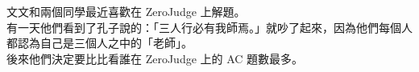 文文和兩個同學最近喜歡在 ZeroJudge 上解題。\\
有一天他們看到了孔子說的：「三人行必有我師焉。」就吵了起來，因為他們每個人都認為自己是三個人之中的「老師」。\\
後來他們決定要比比看誰在 ZeroJudge 上的 AC 題數最多。\\
